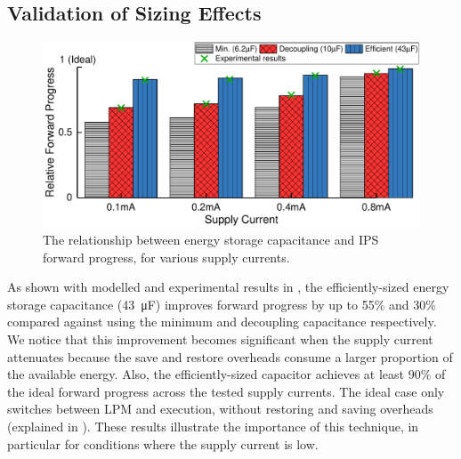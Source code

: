 \subsection{Validation of Sizing Effects}

\begin{figure}
    \centering
    \includegraphics[width=\columnwidth]{ch3_sizingeffect/figures/ImprValidColorFig1}
    \caption{The relationship between energy storage capacitance and IPS forward progress, for various supply currents. }
    \label{fig:imprvalid1}
\end{figure}

As shown with modelled and experimental results in , the efficiently-sized energy storage capacitance (\SI{43}{\micro\farad}) improves forward progress by up to 55\% and 30\% compared against using the minimum and decoupling capacitance respectively. 
We notice that this improvement becomes significant when the supply current attenuates because the save and restore overheads consume a larger proportion of the available energy. 
Also, the efficiently-sized capacitor achieves at least 90\% of the ideal forward progress across the tested supply currents.
The ideal case only switches between LPM and execution, without restoring and saving overheads (explained in ). 
These results illustrate the importance of this technique, in particular for conditions where the supply current is low.

